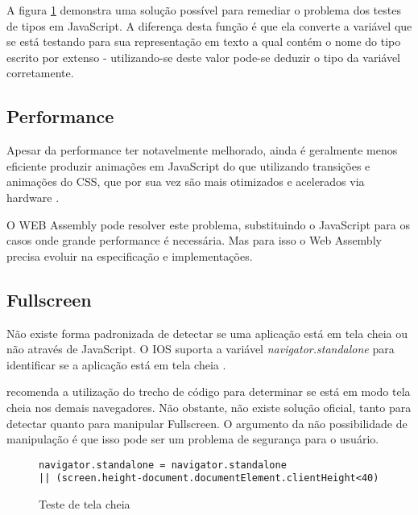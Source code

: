 A figura \ref{fig:fixJSTypes} demonstra uma solução possível para
remediar o problema dos testes de tipos em JavaScript. A diferença
desta função é que ela converte a variável que se está testando
para sua representação em texto a qual contém o nome do tipo escrito
por extenso - utilizando-se deste valor pode-se deduzir o tipo da
variável corretamente.

\subsection{Performance}

Apesar da performance ter notavelmente melhorado, ainda é geralmente
menos eficiente produzir animações em JavaScript do que utilizando
transições e animações do CSS, que por sua vez são mais otimizados
e acelerados via hardware \autocite{html5mostwanted} .

O WEB Assembly pode resolver este problema, substituindo o JavaScript
para os casos onde grande performance é necessária. Mas para isso o
Web Assembly precisa evoluir na especificação e implementações.

\subsection{Fullscreen}

Não existe forma padronizada de detectar se uma aplicação está
em tela cheia ou não através de JavaScript. O IOS suporta a
variável \textit{navigator.standalone } para identificar se a
aplicação está em tela cheia .

\citet{homescreenwebapps} recomenda a utilização do trecho de código
para determinar se está em modo tela cheia nos demais navegadores. Não
obstante, não existe solução oficial, tanto para detectar quanto para
manipular Fullscreen. O argumento da não possibilidade de manipulação
é que isso pode ser um problema de segurança para o usuário.

\begin{figure}[H]
\centering
\begin{verbatim}
navigator.standalone = navigator.standalone 
|| (screen.height-document.documentElement.clientHeight<40)
\end{verbatim}
\caption{Teste de tela cheia}
\label{fig:fixJSTypes}
\end{figure}

